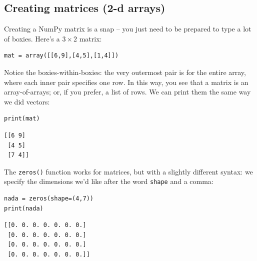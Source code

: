 \subsection*{Creating matrices (2-d arrays)}


Creating a NumPy matrix is a snap -- you just need to be prepared to type a lot
of boxies. Here's a $3\times 2$ matrix:

\begin{Verbatim}[fontsize=\small,samepage=true,frame=single,framesep=3mm]
mat = array([[6,9],[4,5],[1,4]])
\end{Verbatim}
\vspace{-.2in}

Notice the boxies-within-boxies: the very outermost pair is for the entire
array, where each inner pair specifies one row. In this way, you see that a
matrix is an array-of-arrays; or, if you prefer, a list of rows. We can print
them the same way we did vectors:

\begin{Verbatim}[fontsize=\small,samepage=true,frame=single,framesep=3mm]
print(mat)
\end{Verbatim}
\vspace{-.2in}

\begin{Verbatim}[fontsize=\small,samepage=true,frame=leftline,framesep=5mm,framerule=1mm]
[[6 9]
 [4 5]
 [7 4]]
\end{Verbatim}

\medskip
{}

The \texttt{zeros()} function works for matrices, but with a slightly different
syntax: we specify the dimensions we'd like after the word \texttt{shape} and a
comma:

\begin{Verbatim}[fontsize=\small,samepage=true,frame=single,framesep=3mm]
nada = zeros(shape=(4,7))
print(nada)
\end{Verbatim}
\vspace{-.2in}

\begin{Verbatim}[fontsize=\small,samepage=true,frame=leftline,framesep=5mm,framerule=1mm]
[[0. 0. 0. 0. 0. 0. 0.]
 [0. 0. 0. 0. 0. 0. 0.]
 [0. 0. 0. 0. 0. 0. 0.]
 [0. 0. 0. 0. 0. 0. 0.]]
\end{Verbatim}

\medskip
{}

